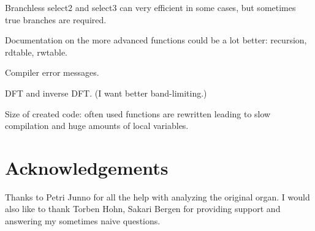 \documentclass[11pt,a4paper]{article}
\begin{document}
Branchless select2 and select3 can very efficient in some cases, but sometimes true branches are required.

Documentation on the more advanced functions could be a lot better: recursion, rdtable, rwtable.

Compiler error messages.

DFT and inverse DFT. (I want better band-limiting.)

Size of created code: often used functions are rewritten leading to slow compilation and huge amounts of local variables.

\section{Acknowledgements}

Thanks to Petri Junno for all the help with analyzing the original organ. I would also like to thank Torben Hohn, Sakari Bergen for providing support and answering my sometimes naive questions. %




\end{document}
